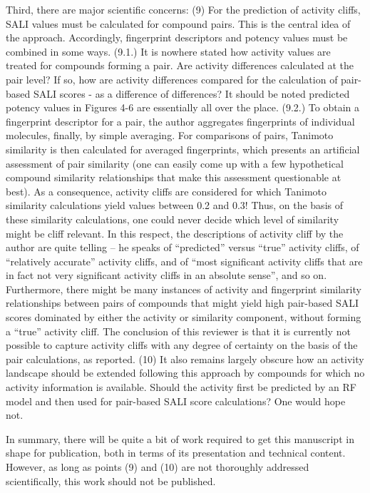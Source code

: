 \documentclass[letterpaper, 12pt]{article}
\begin{document}
Third, there are major scientific concerns:
(9) For the prediction of activity cliffs, SALI values must be calculated for compound pairs. This is the central idea of the approach. Accordingly, fingerprint descriptors and potency values must be combined in some ways. 
(9.1.) It is nowhere stated how activity values are treated for compounds forming a pair. Are activity differences calculated at the pair level? If so, how are activity differences compared for the calculation of pair-based SALI scores - as a difference of differences? It should be noted predicted potency values in Figures 4-6 are essentially all over the place.
(9.2.) To obtain a fingerprint descriptor for a pair, the author aggregates fingerprints of individual molecules, finally, by simple averaging. For comparisons of pairs, Tanimoto similarity is then calculated for averaged fingerprints, which presents an artificial assessment of pair similarity (one can easily come up with a few hypothetical compound similarity relationships that make this assessment questionable at best). As a consequence, activity cliffs are considered for which Tanimoto similarity calculations yield values between 0.2 and 0.3! Thus, on the basis of these similarity calculations, one could never decide which level of similarity might be cliff relevant. In this respect, the descriptions of activity cliff by the author are quite telling – he speaks of “predicted” versus “true” activity cliffs, of “relatively accurate” activity cliffs, and of “most significant activity cliffs that are in fact not very significant activity cliffs in an absolute sense”, and so on. 
Furthermore, there might be many instances of activity and fingerprint similarity relationships between pairs of compounds that might yield high pair-based SALI scores dominated by either the activity or similarity component, without forming a “true” activity cliff. The conclusion of this reviewer is that it is currently not possible to capture activity cliffs with any degree of certainty on the basis of the pair calculations, as reported.
(10) It also remains largely obscure how an activity landscape should be extended following this approach by compounds for which no activity information is available. Should the activity first be predicted by an RF model and then used for pair-based SALI score calculations? One would hope not.

In summary, there will be quite a bit of work required to get this manuscript in shape for publication, both in terms of its presentation and technical content. However, as long as points (9) and (10) are not thoroughly addressed scientifically, this work should not be published.
\end{document}
